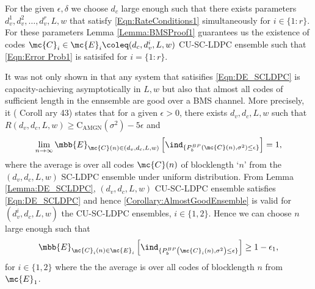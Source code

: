 \documentclass[journal]{IEEEtran}
\begin{document}
\begin{IEEEproof}
For the given $\epsilon,\delta$ we choose $d_{c}$ large enough such that there exists parameters $d_{v}^{1},d_{v}^{2},\ldots,d_{v}^{r},L,w$ that satisfy \eqref{Eqn:RateConditions1} simultaneously for $i \in\{1:r\}$. For these parameters Lemma \ref{Lemma:BMSProof1} guarantees us the existence of codes $\mc{C}_{i}\in\mc{E}_{i}\coleq (d_{c},d_{v}^{i},L,w)$ CU-SC-LDPC ensemble such that \eqref{Eqn:Error Prob1} is satisifed for $i=\{1:r\}$.


It was not only shown in \cite{kudekaruniversal} that any system that satisifies \eqref{Eqn:DE_SCLDPC} 
is capacity-achieving asymptotically in $L, w$ but also that almost all codes of sufficient length in the 
ennsemble are good over a BMS channel. More precisely, it (\cite{kudekaruniversal} Coroll	ary 43) states that for a given $\epsilon >0$, there exists $d_{v},d_{c}, L,w$ such that $R(d_{v},d_{c},L,w)\geq \text{C}_{\text{AMGN}}(\sigma^{2})-5\epsilon$ and
\begin{align}
\lim_{n\rightarrow\infty}\mbb{E}_{\mc{C}(n)\in(d_{v},d_{c},L,w)}\left[ \ind_{\{P_{b}^{BP}\left(\mc{C}(n),\sigma^{2}\right)\leq \epsilon\}}\right]=1,
\label{Corollary:AlmostGoodEnsemble}
\end{align}
where the average is over all codes $\mc{C}(n)$ of blocklength `$n$' from the $(d_{v},d_{c},L,w)$ SC-LDPC ensemble under uniform distribution. From Lemma \ref{Lemma:DE_SCLDPC}, $(d_{v},d_{c},L,w)$ CU-SC-LDPC ensemble satisfies \eqref{Eqn:DE_SCLDPC} and hence \eqref{Corollary:AlmostGoodEnsemble} is valid for $(d_{v}^{i},d_{c},L,w)$ the CU-SC-LDPC ensembles, $i\in\{1,2\}$. Hence we can choose $n$ large enough such that 
\begin{align}
\mbb{E}_{\mc{C}_{i}(n)\in \mc{E}_{i}}\left[	 \ind_{\{P_{b}^{BP}\left(\mc{C}_{i}(n),\sigma^{2}\right)\leq \epsilon\}}\right]\geq 1-\epsilon_{1},
\label{Eqn:Proof1.1}
\end{align}
for $i\in \{1,2\}$ where  the the average is over all codes of blocklength $n$ from $\mc{E}_{1}$.


\end{IEEEproof}
\end{document}
